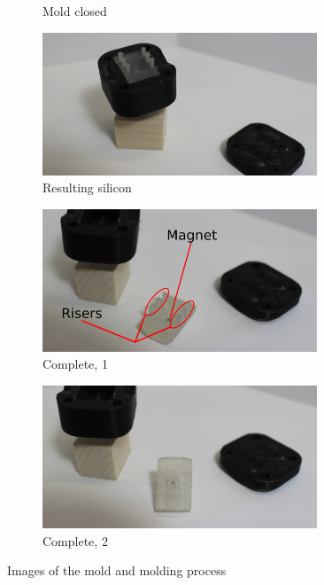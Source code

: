 \begin{figure}
\begin{subfigure}{.45\linewidth}
        \caption{Mold closed}
        \label{fig:closed}
    \end{subfigure}    
    \begin{subfigure}{.45\linewidth}
        \centering
        \includegraphics[width=0.9\textwidth]{Images/mold/withsilicon.png}       
        \caption{Resulting silicon}
        \label{fig:withSilicon}
    \end{subfigure}
    \begin{subfigure}{.45\linewidth}
        \centering
        \includegraphics[width=0.9\textwidth]{Images/mold/complete.png}    
        \caption{Complete, 1}
        \label{fig:complete}
    \end{subfigure}
    \begin{subfigure}{.45\linewidth}
        \centering
        \includegraphics[width=0.9\textwidth]{Images/mold/complete2.png}    
        \caption{Complete, 2}
        \label{fig:complete2}
    \end{subfigure}
    \caption{Images of the mold and molding process}
    \label{figure:Molding}
\end{figure}


